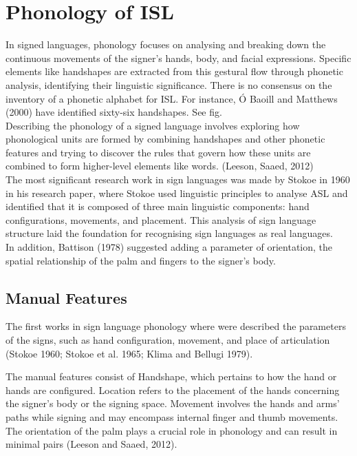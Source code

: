 \section{Phonology of ISL}

In signed languages, phonology focuses on analysing and breaking down the continuous movements of the signer's hands, body, and facial expressions. Specific elements like handshapes are extracted from this gestural flow through phonetic analysis, identifying their linguistic significance. There is no consensus on the inventory of a phonetic alphabet for ISL. For instance, Ó Baoill and Matthews (2000) have identified sixty-six handshapes. See fig. \\
Describing the phonology of a signed language involves exploring
how phonological units are formed by combining handshapes
and other phonetic features and trying to discover the rules that govern how
these units are combined to form higher-level elements like words. (Leeson, Saaed, 2012) \\

The most significant research work in sign languages was made by Stokoe in 1960 in his research paper, where Stokoe used linguistic principles to analyse ASL and identified that it is composed of three main linguistic components: hand configurations, movements, and placement. This analysis of sign language structure laid the foundation for recognising sign languages as real languages.\\

In addition, Battison (1978) suggested adding a parameter of orientation, 
the spatial relationship of the palm and fingers to the signer's body.\\

\subsection{Manual Features} 

The first works in sign language phonology where were described the parameters of the signs, such as hand configuration,
movement, and place of articulation (Stokoe 1960; Stokoe et al. 1965; Klima
and Bellugi 1979).

The manual features consist of Handshape, which pertains to how the hand or hands are configured. Location refers to the placement of the hands concerning the signer's body or the signing space. Movement involves the hands and arms' paths while signing and may encompass internal finger and thumb movements. The orientation of the palm plays a crucial role in phonology and can result in minimal pairs (Leeson and Saaed, 2012).

